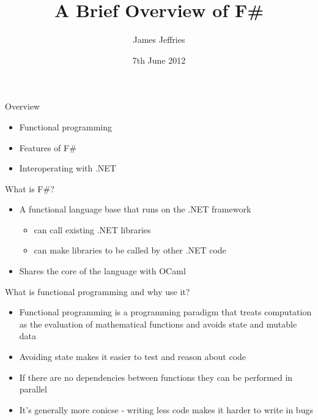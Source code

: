 \documentclass[landscape]{slides}
\author{James Jeffries}
\title{A Brief Overview of F\#}
\date{7th June 2012}
\begin{document}
\begin{slide}
\maketitle
\end{slide}

\begin{slide}{Overview}
\begin{itemize}
\item Functional programming 
\item Features of F\#
\item Interoperating with .NET
\end{itemize}
\end{slide}

\begin{slide}{What is F\#?}
\begin{itemize}
\item A functional language base that runs on the .NET framework
\begin{itemize}
\item can call existing .NET libraries
\item can make libraries to be called by other .NET code
\end{itemize}
\item Shares the core of the language with OCaml
\end{itemize}
\end{slide}

\begin{slide}{What is functional programming and why use it?}
\begin{itemize}
\item Functional programming is a programming paradigm that treats computation as the evaluation of mathematical functions and avoids state and mutable data
\item Avoiding state makes it easier to test and reason about code
\item If there are no dependencies between functions they can be performed in parallel
\item It's generally more conicse - writing less code makes it harder to write in bugs
\end{itemize}
\end{slide}
\end{document}
